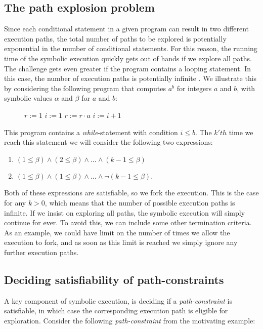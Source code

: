 	\subsection{The path explosion problem} 
		Since each conditional statement in a given program can result in two different execution paths, the total number of paths to be explored is potentially exponential in the number of conditional statements. 
		For this reason, the running time of the symbolic execution quickly gets out of hands if we explore all paths. 
		 The challenge gets even greater if the program contains a looping statement. In this case, the number of execution paths is potentially infinite \citep{CadarSen13}.
		  We illustrate this by considering the following program that computes $a^b$ for integers $a$ and $b$, with symbolic values $\alpha$ and $\beta$ for $a$ and $b$:
		\begin{figure}[!h]
			\begin{algorithmic}
				\State $r := 1$
				\State $i := 1$
					\State $ r := r\cdot a$
					\State $ i := i + 1$
				\EndWhile
				\State {}
				\EndProcedure
			\end{algorithmic}
		\end{figure}
		\pow{}
		
	This program contains a \textsl{while}-statement with condition $i \leq b$. The $k'th$ time we reach this statement we will consider the following two expressions:
	\begin{enumerate}
		\item $(1 \leq \beta) \land (2 \leq \beta) \land \ldots \land (k-1 \leq \beta) $
		\item $(1 \leq \beta) \land (1 \leq \beta) \land \ldots \land \neg (k-1 \leq \beta) $.
	\end{enumerate}
	Both of these expressions are satisfiable, so we fork the execution. This is the case for any $k > 0$, which means that the number of possible execution paths is infinite. If we insist on exploring all paths, the symbolic execution will simply continue for ever. To avoid this, we can include some other termination criteria. As an example, we could have limit on the number of times we allow the execution to fork, and as soon as this limit is reached we simply ignore any further execution paths.
	
	\subsection{Deciding satisfiability of path-constraints}
	A key component of symbolic execution, is deciding if a \emph{path-constraint} is satisfiable, in which case the corresponding execution path is eligible for exploration. Consider the following \emph{path-constraint} from the motivating example:
	
